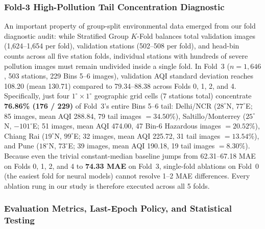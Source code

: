 \documentclass[conference]{IEEEtran}
\begin{document}
\subsubsection{Fold-3 High-Pollution Tail Concentration Diagnostic}

An important property of group-split environmental data emerged from our fold
diagnostic audit: while Stratified Group $K$-Fold balances total validation
images (1,624--1,654 per fold), validation stations (502--508 per fold), and
head-bin counts across all five station folds, individual stations with hundreds
of severe pollution images must remain undivided inside a single fold. In Fold~3
($n = 1,646$, 503 stations, 229 Bins 5--6 images), validation AQI standard
deviation reaches 108.20 (mean 130.71) compared to 79.34--88.38 across Folds 0,
1, 2, and 4. Specifically, just four $1^\circ \times 1^\circ$ geographic grid
cells (7 stations total) concentrate \textbf{76.86\% (176 / 229)} of Fold~3's
entire Bins 5--6 tail: Delhi/NCR ($28^\circ$N, $77^\circ$E; 85 images, mean AQI
288.84, 79 tail images $= 34.50\%$), Saltillo/Monterrey ($25^\circ$N,
$-101^\circ$E; 51 images, mean AQI 474.00, 47 Bin-6 Hazardous images
$= 20.52\%$), Chiang Rai ($19^\circ$N, $99^\circ$E; 32 images, mean AQI 225.72,
31 tail images $= 13.54\%$), and Pune ($18^\circ$N, $73^\circ$E; 39 images, mean
AQI 190.18, 19 tail images $= 8.30\%$). Because even the trivial constant-median
baseline jumps from 62.31--67.18 MAE on Folds 0, 1, 2, and 4 to \textbf{74.33
MAE} on Fold~3, single-fold ablations on Fold~0 (the easiest fold for neural
models) cannot resolve 1--2 MAE differences. Every ablation rung in our study is
therefore executed across all 5 folds.

\subsubsection{Evaluation Metrics, Last-Epoch Policy, and Statistical Testing}
\end{document}
